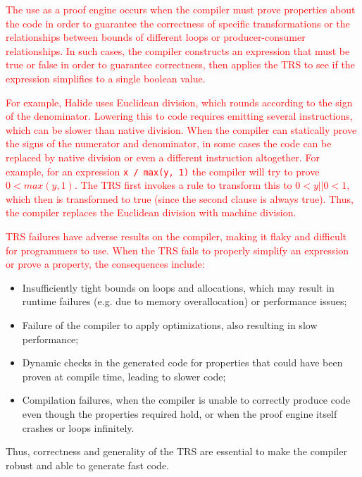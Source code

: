 \documentclass[acmsmall,review]{acmart}\settopmatter{printfolios=true,printccs=false,printacmref=false}
\newcommand{\modified}[1]{\textcolor{red}{{#1}}}
\begin{document}
\modified{The use as a proof engine occurs when the compiler must prove properties about the code in order to guarantee the
  correctness of specific transformations or the relationships between bounds of
  different loops or producer-consumer relationships.  In such cases, the compiler constructs
  an expression that must be true or false in order to guarantee correctness, then applies
  the TRS to see if the expression simplifies to a single boolean value.}

\modified{For example, Halide uses Euclidean division, which rounds according to the sign of the
  denominator.  Lowering this to code requires emitting several instructions, which can be
  slower than native division.  When the compiler can statically prove the signs of the numerator
  and denominator, in some cases the code can be replaced by native division or even a different
  instruction altogether.  For example, for an expression \texttt{x / max(y, 1)} the compiler
  will try to prove $0 < max(y, 1)$.  The TRS first invokes a rule to transform this to
  $0 < y || 0 < 1$, which then is transformed to true (since the second clause is always true).
  Thus, the compiler replaces the Euclidean division with machine division.}

\modified{TRS failures have adverse results on the compiler, making it flaky and
  difficult for programmers to use.  When the TRS fails to properly simplify an expression or
  prove a property, the consequences include: }
\begin{itemize}
\item Insufficiently tight bounds on loops and allocations, which may result in
  runtime failures (e.g. due to memory overallocation) or performance issues;

\item Failure of the compiler to apply optimizations, also resulting in slow performance;

\item Dynamic checks in the generated code for properties that could have been proven
  at compile time, leading to slower code;

\item Compilation failures, when the compiler is unable to correctly produce code
  even though the properties required hold, or when the proof engine itself crashes
  or loops infinitely.
\end{itemize}

Thus, correctness and generality of the TRS are essential to make the compiler
robust and able to generate fast code.
\end{document}
